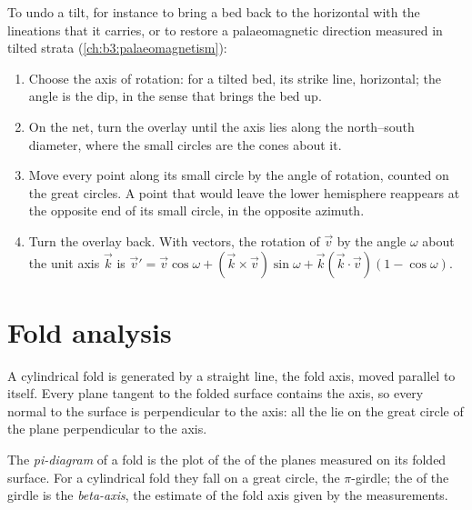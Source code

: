 \begin{method}\label{met:b3:structural-analysis:rotation}
To undo a tilt, for instance to bring a bed back to the horizontal with the
lineations that it carries, or to restore a palaeomagnetic direction measured
in tilted strata (\cref{ch:b3:palaeomagnetism}):
\begin{enumerate}
  \item Choose the axis of rotation: for a tilted bed, its strike line,
        horizontal; the angle is the dip, in the sense that brings the bed up.
  \item On the net, turn the overlay until the axis lies along the
        north--south diameter, where the small circles are the cones about
        it.
  \item Move every point along its small circle by the angle of rotation,
        counted on the great circles. A point that would leave the lower
        hemisphere reappears at the opposite end of its small circle, in the
        opposite azimuth.
  \item Turn the overlay back. With vectors, the rotation of $\vec v$ by the
        angle $\omega$ about the unit axis $\vec k$ is $\vec v' = \vec v
        \cos\omega + (\vec k\times\vec v)\sin\omega + \vec k(\vec k\cdot\vec
        v)(1 - \cos\omega)$.
\end{enumerate}
\end{method}

\section{Fold analysis}\label{sec:b3:structural-analysis:folds}

A cylindrical fold is generated by a straight line, the fold axis, moved
parallel to itself. Every plane tangent to the folded surface contains the
axis, so every normal to the surface is perpendicular to the axis: all the
 lie on the great circle of the plane perpendicular to the axis.

\begin{definition}\label{def:b3:structural-analysis:pi}
The \emph{pi-diagram} of a fold is the plot of the  of
the planes measured on its folded surface. For a cylindrical fold they fall on
a great circle, the $\pi$-girdle; the  of the girdle is the
\emph{beta-axis}, the estimate of the fold axis given by the
measurements.
\end{definition}


